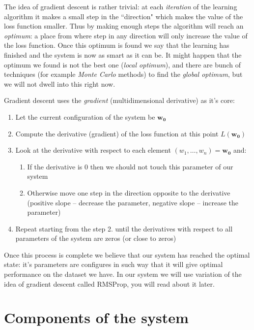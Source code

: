 \documentclass[a4paper,12pt]{article}
\begin{document}
The idea of gradient descent is rather trivial: at each \emph{iteration} of the learning algorithm it makes a small step in the ``direction" which makes the value of the loss function smaller. Thus by making enough steps the algorithm will reach an \emph{optimum}: a place from where step in any direction will only increase the value of the loss function. Once this optimum is found we say that the learning has finished and the system is now as smart as it can be. It might happen that the optimum we found is not the best one (\emph{local optimum}), and there are bunch of techniques (for example \emph{Monte Carlo} methods) to find the \emph{global optimum}, but we will not dwell into this right now. 

Gradient descent uses the \emph{gradient} (multidimensional derivative) as it's core:
\begin{enumerate}
	\item Let the current configuration of the system be $\mathbf{w_0}$
	\item Compute the derivative (gradient) of the loss function at this point $L(\mathbf{w_0})$
	\item Look at the derivative with respect to each element $(w_1, \ldots, w_n) = \mathbf{w_0}$ and:
	\begin{enumerate}
		\item If the derivative is 0 then we should not touch this parameter of our system
		\item Otherwise move one step in the direction opposite to the derivative (positive slope -- decrease the parameter, negative slope -- increase the parameter)
	\end{enumerate}
	\item Repeat starting from the step 2. until the derivatives with respect to all parameters of the system are zeros (or close to zeros)
\end{enumerate}
Once this process is complete we believe that our system has reached the optimal state: it's parameters are configures in such way that it will give optimal performance on the dataset we have. In our system we will use variation of the idea of gradient descent called RMSProp, you will read about it later.



%
%
\pagebreak
\section{Components of the system}
\end{document}
